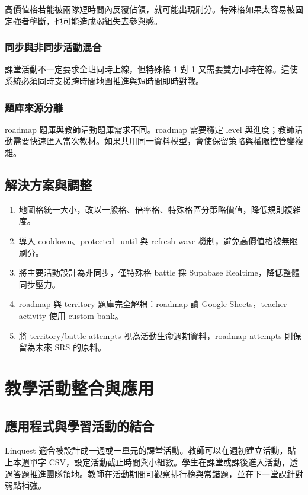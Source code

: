 \documentclass[12pt,a4paper]{article}
\begin{document}
高價值格若能被兩隊短時間內反覆佔領，就可能出現刷分。特殊格如果太容易被固定強者壟斷，也可能造成弱組失去參與感。

\subsubsection{同步與非同步活動混合}

課堂活動不一定要求全班同時上線，但特殊格 1 對 1 又需要雙方同時在線。這使系統必須同時支援跨時間地圖推進與短時間即時對戰。

\subsubsection{題庫來源分離}

roadmap 題庫與教師活動題庫需求不同。roadmap 需要穩定 level 與進度；教師活動需要快速匯入當次教材。如果共用同一資料模型，會使保留策略與權限控管變複雜。

\subsection{解決方案與調整}

\begin{enumerate}
  \item 地圖格統一大小，改以一般格、倍率格、特殊格區分策略價值，降低規則複雜度。
  \item 導入 cooldown、protected\_until 與 refresh wave 機制，避免高價值格被無限刷分。
  \item 將主要活動設計為非同步，僅特殊格 battle 採 Supabase Realtime，降低整體同步壓力。
  \item roadmap 與 territory 題庫完全解耦：roadmap 讀 Google Sheets，teacher activity 使用 custom bank。
  \item 將 territory/battle attempts 視為活動生命週期資料，roadmap attempts 則保留為未來 SRS 的原料。
\end{enumerate}

\section{教學活動整合與應用}

\subsection{應用程式與學習活動的結合}

Linquest 適合被設計成一週或一單元的課堂活動。教師可以在週初建立活動，貼上本週單字 CSV，設定活動截止時間與小組數。學生在課堂或課後進入活動，透過答題推進團隊領地。教師在活動期間可觀察排行榜與常錯題，並在下一堂課針對弱點補強。
\end{document}
